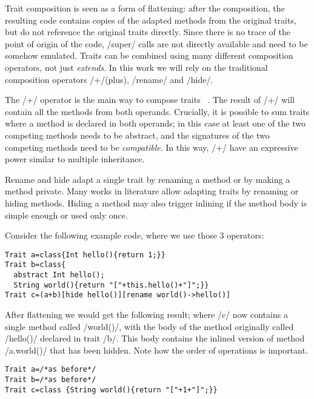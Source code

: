 Trait composition is seen as a form of flattening: after the composition, the resulting code contains copies of the adapted methods from the original traits, but do not reference the original traits directly. Since there is no trace of
the point of origin of the code, /super/ calls are not 
directly available and need to be somehow emulated.
Traits can be combined using many different composition operators, not just \emph{extends}.
In this work we will rely on the traditional composition operators /+/(plus), /rename/ and /hide/.

The /+/ operator is the main way to compose traits
~\cite{scharli2003traits,LagorioSZ09}.
The result of /+/ will contain all the methods from both operands. 
Crucially, it is possible to sum traits where a method is declared in both operands; in this case at least one of the two competing methods needs to be abstract, and the signatures of the two competing methods need to be \emph{compatible}.
In this way, /+/ have an expressive power similar to multiple inheritance.

Rename and hide adapt a single trait by renaming a method or by making a method private.
Many works in literature allow adapting traits by renaming or hiding methods\cite{servetto2014meta,reppy2007metaprogramming,liquori2008feathertrait}. Hiding a method may also trigger inlining if the method body is simple enough or used only once.


Consider the following example code, where we use those 3 operators:
\begin{lstlisting}
Trait a=class{Int hello(){return 1;}}
Trait b=class{
  abstract Int hello();
  String world(){return "["+this.hello()+"]";}}
Trait c=(a+b)[hide hello()][rename world()->hello()]
\end{lstlisting}
After flattening we would get the following result; where /c/ now contains a single method called
/world()/, with the body of the method originally called /hello()/ declared in trait /b/. This body contains the
inlined version of method /a.world()/ that has been hidden.
Note how the order of operations is important.
\begin{lstlisting}
Trait a=/*as before*/
Trait b=/*as before*/
Trait c=class {String world(){return "["+1+"]";}}
\end{lstlisting}

